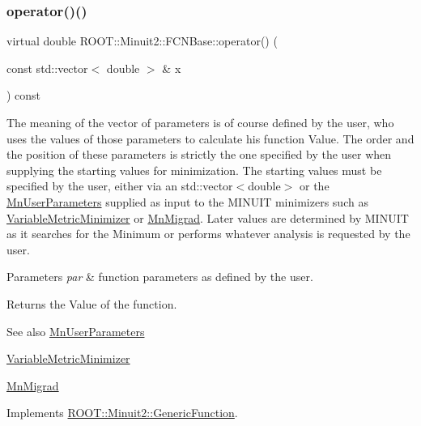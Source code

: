 \subsubsection{\texorpdfstring{operator()()}{operator()()}\hspace{0.1cm}{\footnotesize\ttfamily [2/3]}}
{\footnotesize\ttfamily virtual double R\+O\+O\+T\+::\+Minuit2\+::\+F\+C\+N\+Base\+::operator() (\begin{DoxyParamCaption}\item[{const std\+::vector$<$ double $>$ \&}]{x }\end{DoxyParamCaption}) const\hspace{0.3cm}{\ttfamily [pure virtual]}}

The meaning of the vector of parameters is of course defined by the user, who uses the values of those parameters to calculate his function Value. The order and the position of these parameters is strictly the one specified by the user when supplying the starting values for minimization. The starting values must be specified by the user, either via an std\+::vector$<$double$>$ or the \mbox{\hyperlink{classROOT_1_1Minuit2_1_1MnUserParameters}{Mn\+User\+Parameters}} supplied as input to the M\+I\+N\+U\+IT minimizers such as \mbox{\hyperlink{classROOT_1_1Minuit2_1_1VariableMetricMinimizer}{Variable\+Metric\+Minimizer}} or \mbox{\hyperlink{classROOT_1_1Minuit2_1_1MnMigrad}{Mn\+Migrad}}. Later values are determined by M\+I\+N\+U\+IT as it searches for the Minimum or performs whatever analysis is requested by the user.


\begin{DoxyParams}{Parameters}
{\em par} & function parameters as defined by the user.\\
\hline
\end{DoxyParams}
\begin{DoxyReturn}{Returns}
the Value of the function.
\end{DoxyReturn}
\begin{DoxySeeAlso}{See also}
\mbox{\hyperlink{classROOT_1_1Minuit2_1_1MnUserParameters}{Mn\+User\+Parameters}} 

\mbox{\hyperlink{classROOT_1_1Minuit2_1_1VariableMetricMinimizer}{Variable\+Metric\+Minimizer}} 

\mbox{\hyperlink{classROOT_1_1Minuit2_1_1MnMigrad}{Mn\+Migrad}} 
\end{DoxySeeAlso}


Implements \mbox{\hyperlink{classROOT_1_1Minuit2_1_1GenericFunction_a0d6039ad9aa18e475534d1fd80342e9d}{R\+O\+O\+T\+::\+Minuit2\+::\+Generic\+Function}}.



